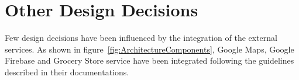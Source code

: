 \section{Other Design Decisions}

Few design decisions have been influenced by the integration of the external services.
As shown in figure~\ref{fig:ArchitectureComponents}, Google Maps, Google Firebase and Grocery Store service have been integrated following the guidelines described in their documentations.